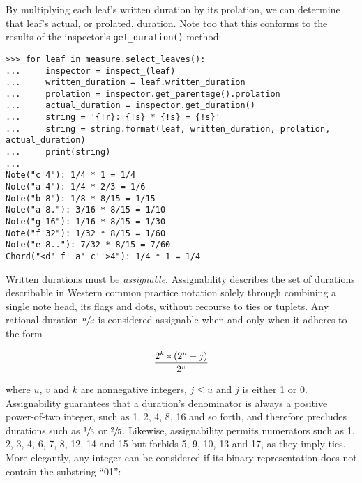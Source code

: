 \noindent By multiplying each leaf's written duration by its prolation, we can
determine that leaf's actual, or prolated, duration. Note too that this
conforms to the results of the inspector's \texttt{get\_duration()} method:

\begin{comment}
<abjad>
for leaf in measure.select_leaves():
    inspector = inspect_(leaf)
    written_duration = leaf.written_duration
    prolation = inspector.get_parentage().prolation
    actual_duration = inspector.get_duration()
    string = '{!r}: {!s} * {!s} = {!s}'
    string = string.format(leaf, written_duration, prolation, actual_duration)
    print(string)

</abjad>
\end{comment}

\begin{abjadbookoutput}
\begin{singlespacing}
\vspace{-0.5\baselineskip}
\begin{verbatim}
>>> for leaf in measure.select_leaves():
...     inspector = inspect_(leaf)
...     written_duration = leaf.written_duration
...     prolation = inspector.get_parentage().prolation
...     actual_duration = inspector.get_duration()
...     string = '{!r}: {!s} * {!s} = {!s}'
...     string = string.format(leaf, written_duration, prolation, actual_duration)
...     print(string)
...
Note("c'4"): 1/4 * 1 = 1/4
Note("a'4"): 1/4 * 2/3 = 1/6
Note("b'8"): 1/8 * 8/15 = 1/15
Note("a'8."): 3/16 * 8/15 = 1/10
Note("g'16"): 1/16 * 8/15 = 1/30
Note("f'32"): 1/32 * 8/15 = 1/60
Note("e'8.."): 7/32 * 8/15 = 7/60
Chord("<d' f' a' c''>4"): 1/4 * 1 = 1/4
\end{verbatim}
\end{singlespacing}
\end{abjadbookoutput}

\noindent Written durations must be \emph{assignable}. Assignability describes
the set of durations describable in Western common practice notation solely
through combining a single note head, its flags and dots, without recourse to
ties or tuplets. Any rational duration $\sfrac{n}{d}$ is considered assignable
when and only when it adheres to the form

\begin{equation}
{ 2^k * (2^u - j) \over 2^v }
\end{equation}

\noindent where $u$, $v$ and $k$ are nonnegative integers, $j \leq u$ and $j$
is either 1 or 0. Assignability guarantees that a duration's denominator is
always a positive power-of-two integer, such as 1, 2, 4, 8, 16 and so forth,
and therefore precludes durations such as $\sfrac{1}{3}$ or $\sfrac{2}{5}$.
Likewise, assignability permits numerators such as 1, 2, 3, 4, 6, 7, 8, 12, 14
and 15 but forbids 5, 9, 10, 13 and 17, as they imply ties. More elegantly, any
integer can be considered if its binary representation does not contain the
substring \enquote{01}:

